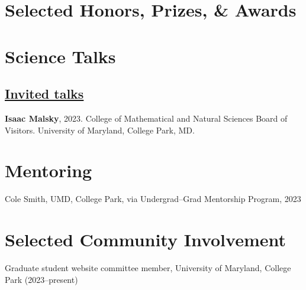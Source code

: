\documentclass[letterpaper,11pt]{article}
\newcommand{\shorterSection}[1]{\vspace{-10pt}\section{#1}}
\newcommand{\shortershorterSection}[1]{\vspace{-10pt}\subsection{#1}}
\begin{document}
\shorterSection{Selected Honors, Prizes, \& Awards}
\small
  \begin{list}{}{\cvlist}
    
\end{list}

\shorterSection{Science Talks}
\vspace{12pt}
\shortershorterSection{\underline{Invited talks}}
\small
  \begin{list}{}{\cvlist}
  \item[{\color{numcolor}\scriptsize3}] \textbf{Isaac Malsky}, 2023. College of Mathematical and Natural Sciences Board of Visitors. University of Maryland, College Park, MD.
  \end{list}

\shorterSection{Mentoring}
\small
  \begin{list}{}{\cvlist}
  \item[{\color{numcolor}}]Cole Smith, UMD, College Park, via Undergrad--Grad Mentorship Program, 2023
  \end{list} 

 \shorterSection{Selected Community Involvement}
 \begin{list}{}{\cvlist}
 \item Graduate student website committee member, University of Maryland, College Park (2023--present)
 \end{list} 
\end{document}
